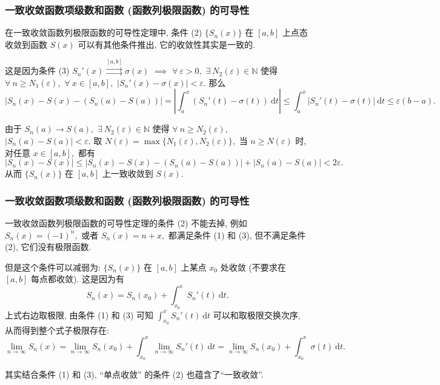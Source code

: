 \begin{frame}
\frametitle{一致收敛函数项级数和函数 (函数列极限函数) 的可导性}

\begin{remark}
在一致收敛函数列极限函数的可导性定理中, 条件 (2) $\{S_n(x)\}$ 在 $[a, b]$ 上点态收敛到函数 $S(x)$ 可以有其他条件推出, 它的收敛性其实是一致的.

\pause
\vspace{0.5em}

这是因为条件 (3) $S_n'(x) \stackrel{[a, b]}{\rightrightarrows} \sigma(x)$ $\implies$ $\forall ~ \varepsilon > 0,$ $\exists ~ N_2(\varepsilon) \in \mathbb{N}$ 使得 $\forall ~ n \geqslant N_1(\varepsilon),$ $\forall ~ x \in [a, b],$ $|S_n'(x) - \sigma(x)| < \varepsilon.$ 那么
\[
\left| S_n(x) - S(x) - (S_n(a) - S(a)) \right| = \left| \int_a^x (S_n'(t) - \sigma(t)) ~ \mathrm{d}t \right| \leqslant \int_a^x |S_n'(t) - \sigma(t)| ~ \mathrm{d}t \leqslant \varepsilon (b - a).
\]

\pause
\vspace{0.5em}

由于 $S_n(a) \to S(a),$ $\exists ~ N_2(\varepsilon) \in \mathbb{N}$ 使得 $\forall ~ n \geqslant N_2(\varepsilon),$ $|S_n(a) - S(a)| < \varepsilon.$ 取 $N(\varepsilon) = \max \{ N_1(\varepsilon), N_2(\varepsilon) \},$ 当 $n \geqslant N(\varepsilon)$ 时, 对任意 $x \in [a, b],$ 都有
\[
\left| S_n(x) - S(x) \right| \leqslant \left| S_n(x) - S(x) - (S_n(a) - S(a)) \right| + |S_n(a) - S(a)| < 2\varepsilon.
\]
从而 $\{S_n(x)\}$ 在 $[a, b]$ 上一致收敛到 $S(x).$
\end{remark}

\end{frame}


\begin{frame}
\frametitle{一致收敛函数项级数和函数 (函数列极限函数) 的可导性}

\begin{remark}
一致收敛函数列极限函数的可导性定理的条件 (2) 不能去掉, 例如 $S_n(x) = (-1)^n,$ 或者 $S_n(x) = n + x,$ 都满足条件 (1) 和 (3), 但不满足条件 (2), 它们没有极限函数.

\pause
\vspace{0.5em}

但是这个条件可以减弱为: $\{S_n(x)\}$ 在 $[a, b]$ 上\alert{某点 $x_0$ 处}收敛 (不要求在 $[a, b]$ 每点都收敛). 这是因为有
\[
S_n(x) = S_n(x_0) + \int_{x_0}^x S_n'(t) ~ \mathrm{d}t.
\]
上式右边取极限, 由条件 (1) 和 (3) 可知 $\int_{x_0}^x S_n'(t) ~ \mathrm{d}t$ 可以和取极限交换次序, 从而得到整个式子极限存在:
\[
\lim_{n\to\infty} S_n(x) = \lim_{n\to\infty} S_n(x_0) + \int_{x_0}^x \lim_{n\to\infty} S_n'(t) ~ \mathrm{d}t = \lim_{n\to\infty} S_n(x_0) + \int_{x_0}^x \sigma(t) ~ \mathrm{d}t.
\]

\pause

其实结合条件 (1) 和 (3), ``单点收敛'' 的条件 (2) 也蕴含了``一致收敛''.
\end{remark}

\end{frame}

